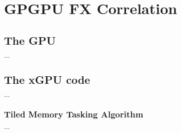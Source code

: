 \chapter{GPGPU FX Correlation }
\label{Chapter5} %

\section{The GPU}
$\ldots$
\section{The xGPU code}
$\ldots$ 
\subsection{Tiled Memory Tasking Algorithm} %
$\ldots$
